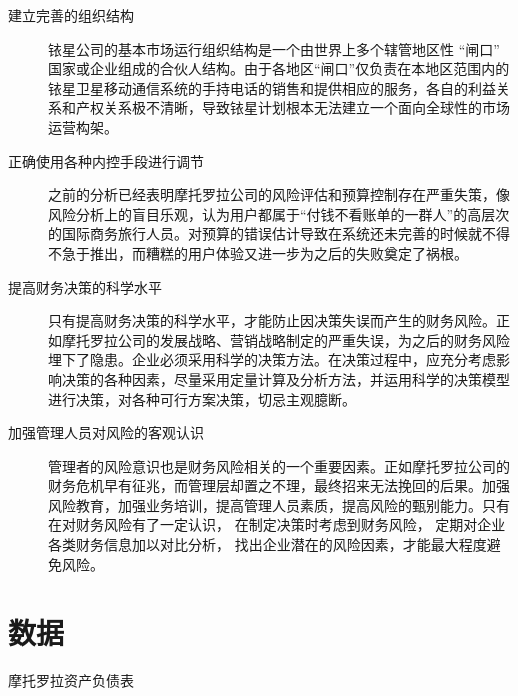 \documentclass{ctexart}
\begin{document}
\begin{description}
	\item[建立完善的组织结构]铱星公司的基本市场运行组织结构是一个由世界上多个辖管地区性 \enquote{闸口} 国家或企业组成的合伙人结构。由于各地区\enquote{闸口}仅负责在本地区范围内的铱星卫星移动通信系统的手持电话的销售和提供相应的服务，各自的利益关系和产权关系极不清晰，导致铱星计划根本无法建立一个面向全球性的市场运营构架。
	\item[正确使用各种内控手段进行调节]之前的分析已经表明摩托罗拉公司的风险评估和预算控制存在严重失策，像风险分析上的盲目乐观，认为用户都属于\enquote{付钱不看账单的一群人}的高层次的国际商务旅行人员。对预算的错误估计导致在系统还未完善的时候就不得不急于推出，而糟糕的用户体验又进一步为之后的失败奠定了祸根。\cite{杨有红2004试论公司治理与内部控制的对接}
	\item[提高财务决策的科学水平]只有提高财务决策的科学水平，才能防止因决策失误而产生的财务风险。正如摩托罗拉公司的发展战略、营销战略制定的严重失误，为之后的财务风险埋下了隐患。企业必须采用科学的决策方法。在决策过程中，应充分考虑影响决策的各种因素，尽量采用定量计算及分析方法，并运用科学的决策模型进行决策，对各种可行方案决策，切忌主观臆断。
	\item[加强管理人员对风险的客观认识]管理者的风险意识也是财务风险相关的一个重要因素。正如摩托罗拉公司的财务危机早有征兆，而管理层却置之不理，最终招来无法挽回的后果。加强风险教育，加强业务培训，提高管理人员素质，提高风险的甄别能力。只有在对财务风险有了一定认识， 在制定决策时考虑到财务风险， 定期对企业各类财务信息加以对比分析， 找出企业潜在的风险因素，才能最大程度避免风险。\cite{孙新宇2016企业财务风险识别与防范案例分析}
\end{description}






\appendix

\section{数据}%
\label{sec:数据}

\begin{table}[htpb]
	\centering
	\caption{摩托罗拉资产负债表}
	\label{tab:摩托罗拉资产负债表}
\end{table}
\end{document}
